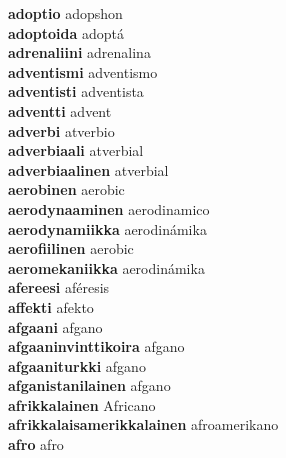\textbf{adoptio } adopshon \\
\textbf{adoptoida } adoptá \\
\textbf{adrenaliini } adrenalina \\
\textbf{adventismi } adventismo \\
\textbf{adventisti } adventista \\
\textbf{adventti } advent \\
\textbf{adverbi } atverbio \\
\textbf{adverbiaali } atverbial \\
\textbf{adverbiaalinen } atverbial \\
\textbf{aerobinen } aerobic \\
\textbf{aerodynaaminen } aerodinamico \\
\textbf{aerodynamiikka } aerodinámika \\
\textbf{aerofiilinen } aerobic \\
\textbf{aeromekaniikka } aerodinámika \\
\textbf{afereesi } aféresis \\
\textbf{affekti } afekto \\
\textbf{afgaani } afgano \\
\textbf{afgaaninvinttikoira } afgano \\
\textbf{afgaaniturkki } afgano \\
\textbf{afganistanilainen } afgano \\
\textbf{afrikkalainen } Africano \\
\textbf{afrikkalaisamerikkalainen } afroamerikano \\
\textbf{afro } afro \\

